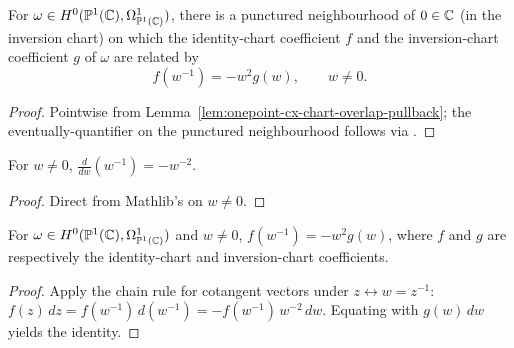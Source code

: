 \begin{lemma}
\label{lem:cotangent-transition-formula}
For \(\omega\in H^{0}(\mathbb{P}^{1}(\mathbb{C}),\Omega^{1}_{\mathbb{P}^{1}(\mathbb{C})})\), there is a
punctured neighbourhood of \(0\in\mathbb{C}\) (in the inversion chart) on
which the identity-chart coefficient \(f\) and the inversion-chart
coefficient \(g\) of \(\omega\) are related by
\[
  f(w^{-1})=-w^{2}g(w),\qquad w\neq 0.
\]
\leanok
\end{lemma}
\begin{proof}\leanok
Pointwise from Lemma~\ref{lem:onepoint-cx-chart-overlap-pullback};
the eventually-quantifier on the punctured neighbourhood follows
via .
\end{proof}

\begin{lemma}
\label{lem:onepoint-cx-chart-overlap-derivative}
For \(w\neq 0\), \(\frac{d}{dw}(w^{-1})=-w^{-2}\).
\leanok
\end{lemma}
\begin{proof}\leanok
Direct from Mathlib's  on \(w\neq 0\).
\end{proof}

\begin{lemma}
\label{lem:onepoint-cx-chart-overlap-pullback}
For \(\omega\in H^{0}(\mathbb{P}^{1}(\mathbb{C}),\Omega^{1}_{\mathbb{P}^{1}(\mathbb{C})})\) and \(w\neq 0\),
\(f(w^{-1})=-w^{2}g(w)\), where \(f\) and \(g\) are respectively the
identity-chart and inversion-chart coefficients.
\leanok
\end{lemma}
\begin{proof}\leanok
Apply the chain rule for cotangent vectors under
\(z\leftrightarrow w=z^{-1}\):
\(f(z)\,dz=f(w^{-1})\,d(w^{-1})=-f(w^{-1})\,w^{-2}\,dw\). Equating
with \(g(w)\,dw\) yields the identity.
\end{proof}

